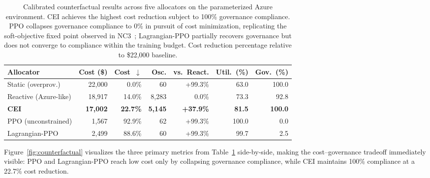 \documentclass[runningheads]{llncs}
\begin{document}
\begin{table}[ht]
\caption{Calibrated counterfactual results across five allocators on the parameterized Azure environment. CEI achieves the highest cost reduction subject to 100\% governance compliance. PPO collapses governance compliance to 0\% in pursuit of cost minimization, replicating the soft-objective fixed point observed in NC3~\cite{paper1}; Lagrangian-PPO partially recovers governance but does not converge to compliance within the training budget. Cost reduction percentage relative to \$22{,}000 baseline.}
\label{tab:counterfactual}
\centering
\footnotesize
\setlength{\tabcolsep}{3.5pt}
\begin{tabular}{lrrrrrr}
\toprule
Allocator & Cost (\$) & Cost~$\downarrow$ & Osc. & vs.\ React. & Util.~(\%) & Gov.~(\%) \\
\midrule
Static (overprov.)    & 22{,}000          &  0.0\%             &    60          & +99.3\%             & 63.0          & 100.0          \\
Reactive (Azure-like) & 18{,}917          & 14.0\%             & 8{,}283        &  0.0\%              & 73.3          &  92.8          \\
\textbf{CEI}          & \textbf{17{,}002} & \textbf{22.7\%}    & \textbf{5{,}145} & \textbf{+37.9\%}  & \textbf{81.5} & \textbf{100.0} \\
PPO (unconstrained)   &  1{,}567          & 92.9\%             &    62          & +99.3\%             & 100.0         &   0.0          \\
Lagrangian-PPO        &  2{,}499          & 88.6\%             &    60          & +99.3\%             &  99.7         &   2.5          \\
\bottomrule
\end{tabular}
\end{table}

Figure~\ref{fig:counterfactual} visualizes the three primary metrics from Table~\ref{tab:counterfactual} side-by-side, making the cost--governance tradeoff immediately visible: PPO and Lagrangian-PPO reach low cost only by collapsing governance compliance, while CEI maintains 100\% compliance at a 22.7\% cost reduction.
\end{document}
